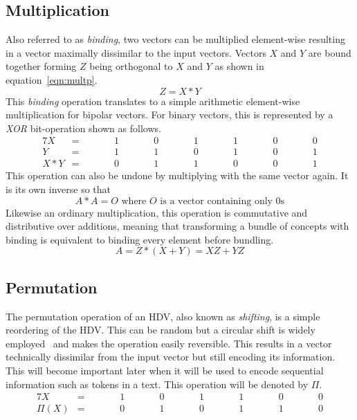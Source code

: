 \subsection{Multiplication} \label{sssec:mult}
Also referred to as \textit{binding}, two vectors can be multiplied element-wise resulting in a vector maximally dissimilar to the input vectors. Vectors $X$ and $Y$ are bound together forming $Z$ being orthogonal to $X$ and $Y$ as shown in equation~\ref{eqn:multp}.
\begin{equation}
    \label{eqn:multp}
    Z = X * Y
\end{equation}
This \textit{binding} operation translates to a simple arithmetic element-wise multiplication for bipolar vectors. For binary vectors, this is represented by a \textit{XOR} bit-operation shown as follows.
\begin{alignat*}{7}
    X &= && \qquad 1 && \qquad 0 && \qquad 1 && \qquad 1 && \qquad 0 && \qquad 0 \\
    Y &= && \qquad 1 && \qquad 1 && \qquad 0 && \qquad 1 && \qquad 0 && \qquad 1 \\
    \hline
    X * Y &= && \qquad 0 && \qquad 1 && \qquad 1 &&  \qquad 0 && \qquad 0 && \qquad 1
\end{alignat*}
This operation can also be undone by multiplying with the same vector again. It is its own inverse so that
\begin{equation}
    \label{eqn:multpinv}
    A * A = O \text{ where $O$ is a vector containing only 0s}
\end{equation}
Likewise an ordinary multiplication, this operation is commutative and distributive over additions, meaning that transforming a bundle of concepts with binding is equivalent to binding every element before bundling.
\begin{equation}
    \label{eqn:multpdis}
    A = Z*(X + Y) = XZ + YZ
\end{equation}
\subsection{Permutation} \label{sssec:perm}
The permutation operation of an HDV, also known as \textit{shifting}, is a simple reordering of the HDV. This can be random but a circular shift is widely employed~\cite{HD_rev} and makes the operation easily reversible. This results in a vector technically dissimilar from the input vector but still encoding its information. This will become important later when it will be used to encode sequential information such as tokens in a text. This operation will be denoted by $\Pi$.
\begin{alignat*}{7}
    X &= && \qquad 1 && \qquad 0 && \qquad 1 && \qquad 1 && \qquad 0 && \qquad 0 \\
    \hline
    \Pi(X) &= && \qquad 0 && \qquad 1 && \qquad 0 &&  \qquad 1 && \qquad 1 && \qquad 0
\end{alignat*}
